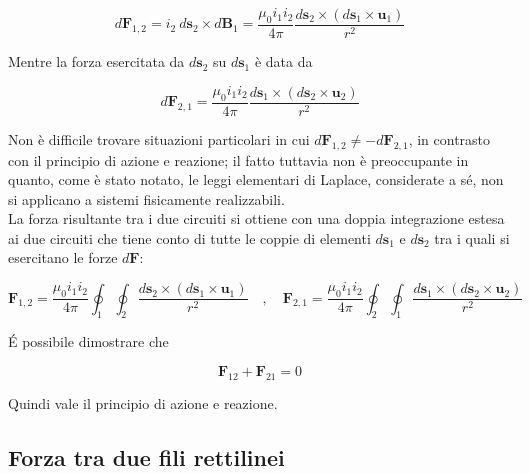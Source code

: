 \begin{equation}
    d \mathbf{F}_{1,2} = i_2 \ d \mathbf{s}_2 \times d \mathbf{B}_1 = \frac{\mu_0 i_1 i_2}{4 \pi} \frac{ d \mathbf{s}_2 \times (d \mathbf{s}_1 \times \mathbf{u}_1)}{r^2}
\end{equation}

Mentre la forza esercitata da $d \mathbf{s}_2$ su $d \mathbf{s}_1$ è data da 

\begin{equation}
    d \mathbf{F}_{2,1} = \frac{\mu_0 i_1 i_2}{4 \pi} \frac{ d \mathbf{s}_1 \times (d \mathbf{s}_2 \times \mathbf{u}_2)}{r^2}
\end{equation}

Non è difficile trovare situazioni particolari in cui $d\mathbf{F}_{1,2} \neq - d\mathbf{F}_{2,1}$, in contrasto con il principio di azione e reazione; il fatto tuttavia non è preoccupante in quanto, come è stato notato, le leggi elementari di Laplace, considerate a sé, non si applicano a sistemi fisicamente realizzabili.\\

La forza risultante tra i due circuiti si ottiene con una doppia integrazione estesa ai due circuiti che tiene conto di tutte le coppie di elementi $d\mathbf{s}_1$ e $d \mathbf{s}_2$ tra i quali si esercitano le forze $d \mathbf{F}$:

\begin{tcolorbox}[colback=yellow!10!white, colframe=orange!70!black, boxrule=0.8pt]
\begin{equation} 
    \mathbf{F}_{1,2} = \frac{\mu_0 i_1 i_2}{4 \pi} \oint_1 \oint_2 \frac{d \mathbf{s}_2 \times (d\mathbf{s}_1 \times \mathbf{u}_1)}{r^2} \quad , \quad \mathbf{F}_{2,1} = \frac{\mu_0 i_1 i_2}{4 \pi} \oint_2 \oint_1 \frac{d \mathbf{s}_1 \times (d\mathbf{s}_2 \times \mathbf{u}_2)}{r^2}
\end{equation}
\end{tcolorbox}

\'E possibile dimostrare che 

\begin{equation}
    \mathbf{F}_{12} + \mathbf{F}_{21} = 0
\end{equation}

Quindi vale il principio di azione e reazione. 

\subsection{Forza tra due fili rettilinei}

